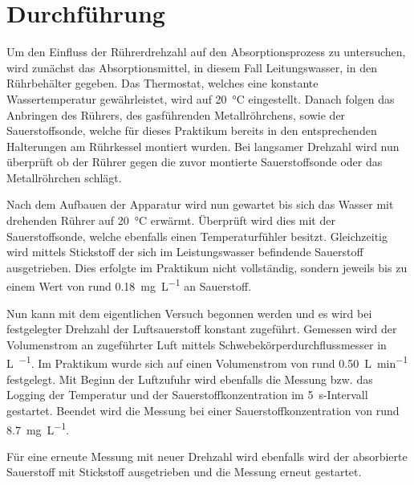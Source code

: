 \section{Durchführung}
\label{sec:durchfuerung}

Um den Einfluss der Rührerdrehzahl auf den Absorptionsprozess zu untersuchen, wird zunächst das Absorptionsmittel, in diesem Fall Leitungswasser, in den Rührbehälter gegeben.
Das Thermostat, welches eine konstante Wassertemperatur gewährleistet, wird auf \SI{20}{\celsius} eingestellt. Danach folgen das Anbringen des Rührers, des gasführenden Metallröhrchens, sowie der Sauerstoffsonde, welche für dieses Praktikum bereits in den entsprechenden Halterungen am Rührkessel montiert wurden. 
Bei langsamer Drehzahl wird nun überprüft ob der Rührer gegen die zuvor montierte Sauerstoffsonde oder das Metallröhrchen schlägt.

Nach dem Aufbauen der Apparatur wird nun gewartet bis sich das Wasser mit drehenden Rührer auf \SI{20}{\celsius} erwärmt. Überprüft wird dies mit der Sauerstoffsonde, welche ebenfalls einen Temperaturfühler besitzt.
Gleichzeitig wird mittels Stickstoff der sich im Leistungswasser befindende Sauerstoff ausgetrieben. Dies erfolgte im Praktikum nicht vollständig, sondern jeweils bis zu einem Wert von rund \SI{0,18}{\milli \gram \per \liter} an Sauerstoff.

Nun kann mit dem eigentlichen Versuch begonnen werden und es wird bei festgelegter Drehzahl der Luftsauerstoff konstant zugeführt. Gemessen wird der Volumenstrom an zugeführter Luft mittels Schwebekörperdurchflussmesser in \si{\liter \per \min}. Im Praktikum wurde sich auf einen Volumenstrom von rund \SI{0,50}{\liter \per \minute} festgelegt.
Mit Beginn der Luftzufuhr wird ebenfalls die Messung bzw. das Logging der Temperatur und der Sauerstoffkonzentration im \SI{5}{\second}-Intervall gestartet.
Beendet wird die Messung bei einer Sauerstoffkonzentration von rund \SI{8,7}{\milli\gram \per \liter}.

Für eine erneute Messung mit neuer Drehzahl wird ebenfalls wird der absorbierte Sauerstoff mit Stickstoff ausgetrieben und die Messung erneut gestartet.